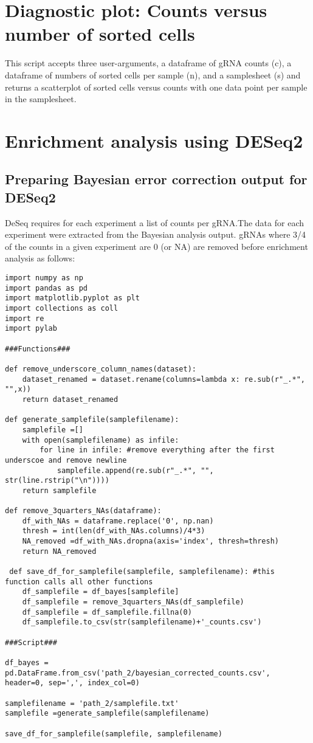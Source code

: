 \section{Diagnostic plot: Counts versus number of sorted cells}

This script accepts three user-arguments, a dataframe of gRNA counts (c), a dataframe of numbers of sorted cells per sample (n), and a samplesheet (s) and returns a scatterplot of sorted cells versus counts with one data point per sample in the samplesheet.



\section{Enrichment analysis using DESeq2}

\subsection{Preparing Bayesian error correction output for DESeq2}

DeSeq requires for each experiment a list of counts per gRNA.The data for each experiment were extracted from the Bayesian analysis output. gRNAs where 3/4 of the counts in a given experiment are 0 (or NA) are removed before enrichment analysis as follows:

\begin{lstlisting}
import numpy as np
import pandas as pd
import matplotlib.pyplot as plt
import collections as coll
import re
import pylab

###Functions###

def remove_underscore_column_names(dataset):
    dataset_renamed = dataset.rename(columns=lambda x: re.sub(r"_.*", "",x))
    return dataset_renamed
    
def generate_samplefile(samplefilename):
    samplefile =[]
    with open(samplefilename) as infile:
        for line in infile: #remove everything after the first underscoe and remove newline
            samplefile.append(re.sub(r"_.*", "", str(line.rstrip("\n"))))
    return samplefile
    
def remove_3quarters_NAs(dataframe):
    df_with_NAs = dataframe.replace('0', np.nan)
    thresh = int(len(df_with_NAs.columns)/4*3)
    NA_removed =df_with_NAs.dropna(axis='index', thresh=thresh)
    return NA_removed
    
 def save_df_for_samplefile(samplefile, samplefilename): #this function calls all other functions
    df_samplefile = df_bayes[samplefile]
    df_samplefile = remove_3quarters_NAs(df_samplefile)
    df_samplefile = df_samplefile.fillna(0)
    df_samplefile.to_csv(str(samplefilename)+'_counts.csv')

###Script###

df_bayes = pd.DataFrame.from_csv('path_2/bayesian_corrected_counts.csv', header=0, sep=',', index_col=0)

samplefilename = 'path_2/samplefile.txt'
samplefile =generate_samplefile(samplefilename)

save_df_for_samplefile(samplefile, samplefilename)
\end{lstlisting}


